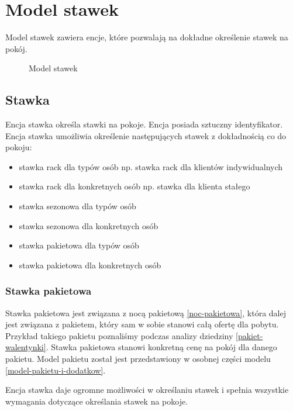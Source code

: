 \documentclass[a4paper,onecolumn,oneside,11pt,wide,floatssmall]{mwrep}
\theoremstyle{definition}
\theoremstyle{plain}%
\theoremstyle{remark}
\begin{document}
\section{Model stawek}
Model stawek zawiera encje, które pozwalają na dokładne określenie stawek na pokój. 


\begin{figure}[H]
  \begin{center}
  \end{center}
  \caption{Model stawek}
  \label{fig:db-logical-model-rates}
\end{figure}

\subsection{Stawka}
Encja stawka określa stawki na pokoje. Encja posiada sztuczny identyfikator. Encja stawka umożliwia określenie następujących stawek z dokładnością co do pokoju:

\begin{itemize}
  \item stawka rack dla typów osób np. stawka rack dla klientów indywidualnych
  \item stawka rack dla konkretnych osób np. stawka dla klienta stałego
  \item stawka sezonowa dla typów osób
  \item stawka sezonowa dla konkretnych osób
  \item stawka pakietowa dla typów osób
  \item stawka pakietowa dla konkretnych osób
\end{itemize}

\subsubsection{Stawka pakietowa}
Stawka pakietowa jest związana z nocą pakietową \ref{noc-pakietowa}, która dalej jest związana z pakietem, który sam w sobie stanowi całą ofertę dla pobytu. Przykład takiego pakietu poznaliśmy podczas analizy dziedziny \ref{pakiet-walentynki}. Stawka pakietowa stanowi konkretną cenę na pokój dla danego pakietu. Model pakietu został jest przedstawiony w osobnej części modelu \ref{model-pakietu-i-dodatkow}.

Encja stawka daje ogromne możliwości w określaniu stawek i spełnia wszystkie wymagania dotyczące określania stawek na pokoje. 
\end{document}
